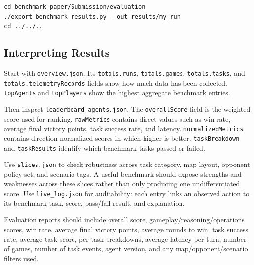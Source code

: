 \documentclass{article}
\begin{document}
\begin{verbatim}
cd benchmark_paper/Submission/evaluation
./export_benchmark_results.py --out results/my_run
cd ../../..
\end{verbatim}

\subsection{Interpreting Results}

Start with \texttt{overview.json}. Its \texttt{totals.runs}, \texttt{totals.games}, \texttt{totals.tasks}, and \texttt{totals.telemetryRecords} fields show how much data has been collected. \texttt{topAgents} and \texttt{topPlayers} show the highest aggregate benchmark entries.

Then inspect \texttt{leaderboard\_agents.json}. The \texttt{overallScore} field is the weighted score used for ranking. \texttt{rawMetrics} contains direct values such as win rate, average final victory points, task success rate, and latency. \texttt{normalizedMetrics} contains direction-normalized scores in which higher is better. \texttt{taskBreakdown} and \texttt{taskResults} identify which benchmark tasks passed or failed.

Use \texttt{slices.json} to check robustness across task category, map layout, opponent policy set, and scenario tags. A useful benchmark should expose strengths and weaknesses across these slices rather than only producing one undifferentiated score. Use \texttt{live\_log.json} for auditability: each entry links an observed action to its benchmark task, score, pass/fail result, and explanation.

Evaluation reports should include overall score, gameplay/reasoning/operations scores, win rate, average final victory points, average rounds to win, task success rate, average task score, per-task breakdowns, average latency per turn, number of games, number of task events, agent version, and any map/opponent/scenario filters used.
\end{document}
